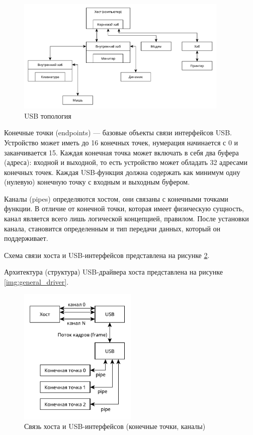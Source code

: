 \begin{figure}[!htb]\centering
	\includegraphics[width=0.9\textwidth]{../img/topology.pdf}
	\caption{USB топология}
	\label{img:topology}
\end{figure}

\newpage

Конечные точки (endpoints) --- базовые объекты связи интерфейсов USB.
Устройство может иметь до 16 конечных точек, нумерация начинается с 0 и заканчивается 15.
Каждая конечная точка может включать в себя два буфера (адреса): входной и выходной, то есть устройство может обладать 32 адресами конечных точек.
Каждая USB-функция должна содержать как минимум одну (нулевую) конечную точку с входным и выходным буфером.

Каналы (pipes) определяются хостом, они связаны с конечными точками функции.
В отличие от конечной точки, которая имеет физическую сущность, канал является всего лишь логической концепцией, правилом.
После установки канала, становится определенным и тип передачи данных, который он поддерживает.

Схема связи хоста и USB-интерфейсов представлена на рисунке \ref{img:endpoints}.

Архитектура (структура) USB-драйвера хоста представлена на рисунке \ref{img:general_driver}.

\begin{figure}[!htb]\centering
	\includegraphics[width=0.5\textwidth]{../img/endpoints.pdf}
	\caption{Связь хоста и USB-интерфейсов (конечные точки, каналы)}
	\label{img:endpoints}
\end{figure}

